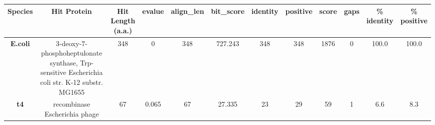 \begin{tabular}{|c|c|c|c|c|c|c|c|c|c|c|c|} \hline
\textbf{Species} & \textbf{Hit Protein} & \textbf{Hit Length (a.a.)} & \textbf{evalue} & \textbf{align\_len} & \textbf{bit\_score} & \textbf{identity} & \textbf{positive} & \textbf{score} & \textbf{gaps} & \textbf{\% identity} & \textbf{\% positive} \\ \hline
\textbf{E.coli} & 3-deoxy-7-phosphoheptulonate synthase, Trp-sensitive Escherichia coli str. K-12 substr. MG1655 & 348 & 0 & 348 & 727.243 & 348 & 348 & 1876 & 0 & 100.0 & 100.0\\
\textbf{t4} & recombinase Escherichia phage  & 67 & 0.065 & 67 & 27.335 & 23 & 29 & 59 & 1 & 6.6 & 8.3\\
\hline \end{tabular}
